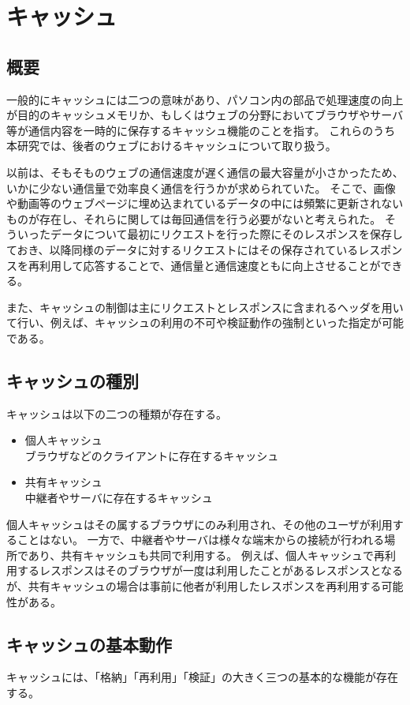 \documentclass[12pt,a4paper]{jbook}
\begin{document}
\section{キャッシュ}
\label{sec:cache}
\subsection{概要}
一般的にキャッシュには二つの意味があり、パソコン内の部品で処理速度の向上が目的のキャッシュメモリか、もしくはウェブの分野においてブラウザやサーバ等が通信内容を一時的に保存するキャッシュ機能のことを指す。
これらのうち本研究では、後者のウェブにおけるキャッシュについて取り扱う。

以前は、そもそものウェブの通信速度が遅く通信の最大容量が小さかったため、いかに少ない通信量で効率良く通信を行うかが求められていた。
そこで、画像や動画等のウェブページに埋め込まれているデータの中には頻繁に更新されないものが存在し、それらに関しては毎回通信を行う必要がないと考えられた。
そういったデータについて最初にリクエストを行った際にそのレスポンスを保存しておき、以降同様のデータに対するリクエストにはその保存されているレスポンスを再利用して応答することで、通信量と通信速度ともに向上させることができる。

また、キャッシュの制御は主にリクエストとレスポンスに含まれるヘッダを用いて行い、例えば、キャッシュの利用の不可や検証動作の強制といった指定が可能である。

\color{red}
\subsection{キャッシュの種別}
キャッシュは以下の二つの種類が存在する。
\begin{itemize}
\item 個人キャッシュ \\
ブラウザなどのクライアントに存在するキャッシュ
\item 共有キャッシュ \\
中継者やサーバに存在するキャッシュ
\end{itemize}
個人キャッシュはその属するブラウザにのみ利用され、その他のユーザが利用することはない。
一方で、中継者やサーバは様々な端末からの接続が行われる場所であり、共有キャッシュも共同で利用する。
例えば、個人キャッシュで再利用するレスポンスはそのブラウザが一度は利用したことがあるレスポンスとなるが、共有キャッシュの場合は事前に他者が利用したレスポンスを再利用する可能性がある。
\color{black}

\subsection{キャッシュの基本動作}
キャッシュには、「格納」「再利用」「検証」の大きく三つの基本的な機能が存在する。
\end{document}
